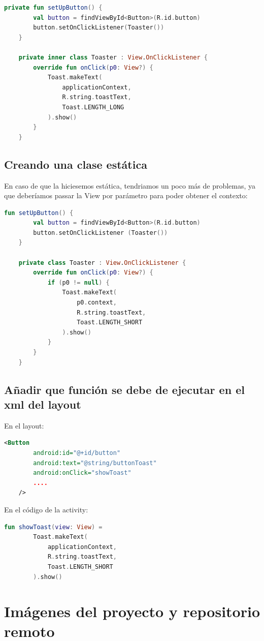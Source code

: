 \documentclass[12pt, letterpaper]{article}
\begin{document}
\begin{lstlisting}[language=Kotlin]
    private fun setUpButton() {
        val button = findViewById<Button>(R.id.button)
        button.setOnClickListener(Toaster())
    }

    private inner class Toaster : View.OnClickListener {
        override fun onClick(p0: View?) {
            Toast.makeText(
                applicationContext,
                R.string.toastText,
                Toast.LENGTH_LONG
            ).show()
        }
    }
\end{lstlisting}

\subsection{Creando una clase estática}
En caso de que la hiciesemos estática, tendriamos un poco más de problemas, ya que deberíamos passar la View por parámetro para poder obtener el contexto:
\begin{lstlisting}[language=Kotlin]
    fun setUpButton() {
        val button = findViewById<Button>(R.id.button)
        button.setOnClickListener (Toaster())
    }

    private class Toaster : View.OnClickListener {
        override fun onClick(p0: View?) {
            if (p0 != null) {
                Toast.makeText(
                    p0.context,
                    R.string.toastText,
                    Toast.LENGTH_SHORT
                ).show()
            }
        }
    }
\end{lstlisting}

\subsection{Añadir que función se debe de ejecutar en el xml del layout}
En el layout:
\begin{lstlisting}[language=XML]
    <Button
        android:id="@+id/button"
        android:text="@string/buttonToast"
        android:onClick="showToast"
        ....
    />
\end{lstlisting}

En el código de la activity:
\begin{lstlisting}[language=Kotlin]
    fun showToast(view: View) =
        Toast.makeText(
            applicationContext,
            R.string.toastText,
            Toast.LENGTH_SHORT
        ).show()
\end{lstlisting}

\newpage
\section{Imágenes del proyecto y repositorio remoto}
\end{document}
